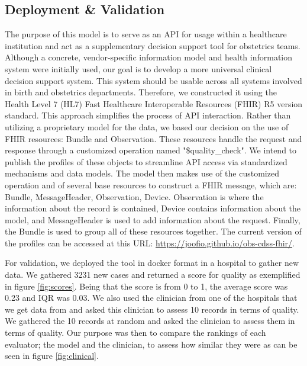 \subsection{Deployment \& Validation}
The purpose of this model is to serve as an API for usage within a healthcare institution and act as a supplementary decision support tool for obstetrics teams. Although a concrete, vendor-specific information model and health information system were initially used, our goal is to develop a more universal clinical decision support system. This system should be usable across all systems involved in birth and obstetrics departments. Therefore, we constructed it using the Health Level 7 (HL7) Fast Healthcare Interoperable Resources (FHIR) R5 version standard. This approach simplifies the process of API interaction.
Rather than utilizing a proprietary model for the data, we based our decision on the use of FHIR resources: Bundle and Observation. These resources handle the request and response through a customized operation named "\$quality\_check". We intend to publish the profiles of these objects to streamline API access via standardized mechanisms and data models. The model then makes use of the customized operation and of several base resources to construct a FHIR message, which are: Bundle, MessageHeader, Observation, Device. Observation is where the information about the record is contained, Device contains information about the model, and MessageHeader is used to add information about the request. Finally, the Bundle is used to group all of these resources together. The current version of the profiles can be accessed at this URL: \url{https://joofio.github.io/obs-cdss-fhir/}. 


For validation, we deployed the tool in docker format in a hospital to gather new data. We gathered 3231 new cases and returned a score for quality as exemplified in figure \ref{fig:scores}. Being that the score is from 0 to 1, the average score was 0.23 and IQR was 0.03. We also used the clinician from one of the hospitals that we get data from and asked this clinician to assess 10 records in terms of quality. We gathered the 10 records at random and asked the clinician to assess them in terms of quality. Our purpose was then to compare the rankings of each evaluator; the model and the clinician, to assess how similar they were as can be seen in figure \ref{fig:clinical}.





